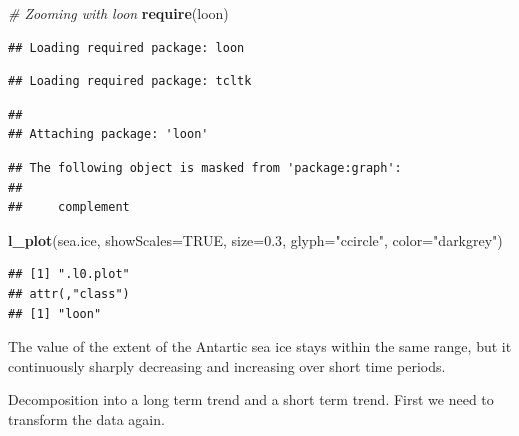 \documentclass[9pt,letter]{article}
\newenvironment{Shaded}{\begin{snugshade}}{\end{snugshade}}
\newcommand{\KeywordTok}[1]{\textcolor[rgb]{0.13,0.29,0.53}{\textbf{#1}}}
\newcommand{\DataTypeTok}[1]{\textcolor[rgb]{0.13,0.29,0.53}{#1}}
\newcommand{\FloatTok}[1]{\textcolor[rgb]{0.00,0.00,0.81}{#1}}
\newcommand{\StringTok}[1]{\textcolor[rgb]{0.31,0.60,0.02}{#1}}
\newcommand{\CommentTok}[1]{\textcolor[rgb]{0.56,0.35,0.01}{\textit{#1}}}
\newcommand{\OtherTok}[1]{\textcolor[rgb]{0.56,0.35,0.01}{#1}}
\newcommand{\OperatorTok}[1]{\textcolor[rgb]{0.81,0.36,0.00}{\textbf{#1}}}
\newcommand{\NormalTok}[1]{#1}
\begin{document}
\begin{Shaded}
\begin{Highlighting}[]
\CommentTok{# Zooming with loon}
\KeywordTok{require}\NormalTok{(loon)}
\end{Highlighting}
\end{Shaded}

\begin{verbatim}
## Loading required package: loon
\end{verbatim}

\begin{verbatim}
## Loading required package: tcltk
\end{verbatim}

\begin{verbatim}
## 
## Attaching package: 'loon'
\end{verbatim}

\begin{verbatim}
## The following object is masked from 'package:graph':
## 
##     complement
\end{verbatim}

\begin{Shaded}
\begin{Highlighting}[]
\KeywordTok{l_plot}\NormalTok{(sea.ice, }\DataTypeTok{showScales=}\OtherTok{TRUE}\NormalTok{, }
     \DataTypeTok{size=}\FloatTok{0.3}\NormalTok{, }\DataTypeTok{glyph=}\StringTok{"ccircle"}\NormalTok{, }
     \DataTypeTok{color=}\StringTok{"darkgrey"}\NormalTok{)}
\end{Highlighting}
\end{Shaded}

\begin{verbatim}
## [1] ".l0.plot"
## attr(,"class")
## [1] "loon"
\end{verbatim}

The value of the extent of the Antartic sea ice stays within the same
range, but it continuously sharply decreasing and increasing over short
time periods.

\item 

Decomposition into a long term trend and a short term trend. First we
need to transform the data again.

\begin{Shaded}
\end{Shaded}
\end{document}

